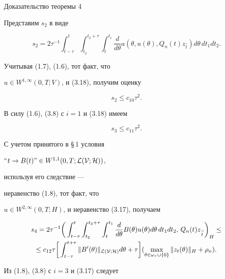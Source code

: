 \begin{pf*}{Доказательство теоремы 4}
\begin{equation}
\end{equation}


Представим $s_2$ в виде


$$


s_2=2\tau^{-1}\int_{t-\tau}^t\int_{t_2}^{t_2+\tau}\int_t^{t_1}


\frac d{d\theta}a(\theta,u(\theta),Q_n(t)


z_{\overset{\,\circ}{t}})d\theta\, dt_1dt_2.


$$


Учитывая (1.7), (1.6), тот факт, что


$u\in W^{1,\infty}(0,T;V)$, и (3.18), получим оценку


\begin{equation}


s_2\le c_{10}\tau^2.


\end{equation}


В силу (1.6), (3.8) с $i=1$ и (3.18) имеем


\begin{equation}


s_3\le c_{11}\tau^2.


\end{equation}


С учетом принятого в \S\,1 условия


``$t\to B(t)\text{''}\in W^{1,1}(0,T;\cal L(V;H))$,


используя его следствие ---


неравенство (1.8), тот факт, что


$u\in W^{2,\infty}(0,T;H)$, и неравенство (3.17), получаем


\begin{multline}


s_4 =2\tau^{-1}\bigg(\int_{t-\tau}^t\int_{t_2}^{t_2+\tau}\int_t^{t_1}


\frac d{d\theta}B(\theta)u(\theta)d\theta\, dt_1dt_2,\,Q_n(t)


z_{\overset{\,\circ}{t}}\bigg)_H\le\\


\le c_{12}\tau\bigg[\int_{t-\tau}^{t+\tau}\|B'(\theta)\|_


{\cal L(V;H)}d\theta+\tau\bigg](\max\limits_


{\theta\in\omega_{\tau}\cup\{0\}}\|z_t(\theta)\|_H+\rho_n).


\end{multline}


Из (1.8), (3.8) с $i=3$ и (3.17) следует



\end{pf*}
